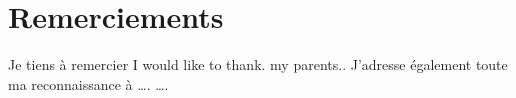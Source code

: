 \hypertarget{remerciements}{%
\chapter*{Remerciements}\label{remerciements}}

Je tiens à remercier I would like to thank. my parents.. J'adresse
également toute ma reconnaissance à \ldots. \ldots.
